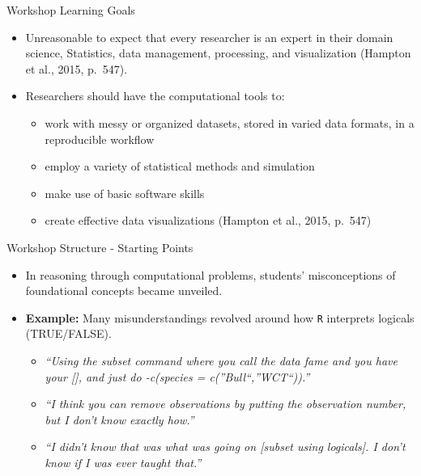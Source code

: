 \documentclass[10pt,ignorenonframetext,]{beamer}
\providecommand{\tightlist}{%
  \setlength{\itemsep}{0pt}\setlength{\parskip}{0pt}}
\begin{document}
\begin{frame}{Workshop Learning Goals}

\begin{itemize}[<+->]
\item
  Unreasonable to expect that every researcher is an expert in their
  domain science, Statistics, data management, processing, and
  visualization (Hampton et al., 2015, p.~547).
\item
  Researchers should have the computational tools to:

  \begin{itemize}[<+->]
  \tightlist
  \item
    work with messy or organized datasets, stored in varied data
    formats, in a reproducible workflow\\
  \item
    employ a variety of statistical methods and simulation\\
  \item
    make use of basic software skills\\
  \item
    create effective data visualizations (Hampton et al., 2015, p.~547)
  \end{itemize}
\end{itemize}

\end{frame}

\begin{frame}[fragile]{Workshop Structure - Starting Points}

\begin{itemize}[<+->]
\item
  In reasoning through computational problems, students' misconceptions
  of foundational concepts became unveiled.
\item
  \textbf{Example:} Many misunderstandings revolved around how
  \texttt{R} interprets logicals (TRUE/FALSE).

  \begin{itemize}[<+->]
  \tightlist
  \item
    \emph{``Using the subset command where you call the data fame and
    you have your {[}{]}, and just do -c(species =
    c(''Bull``,''WCT``)).''}\\
  \item
    \emph{``I think you can remove observations by putting the
    observation number, but I don't know exactly how.''}
  \item
    \emph{``I didn't know that was what was going on {[}subset using
    logicals{]}. I don't know if I was ever taught that.''}
  \end{itemize}
\end{itemize}

\end{frame}
\end{document}
